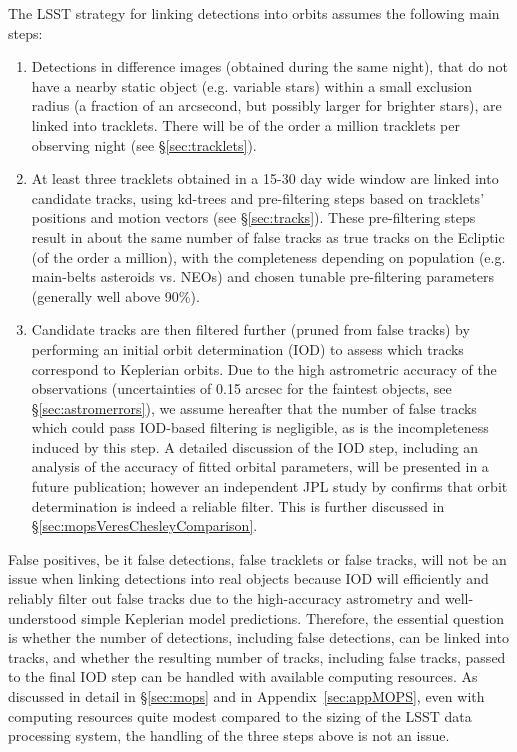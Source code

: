 The LSST strategy for linking detections into orbits assumes the following main steps:
\begin{enumerate}
\item Detections in difference images (obtained during the same night), that do not
         have a nearby static object (e.g. variable stars) within a small exclusion radius
         (a fraction of an arcsecond, but possibly larger for brighter stars), are linked into tracklets. There will be of the order
         a million tracklets per observing night (see \S\ref{sec:tracklets}).
\item At least three tracklets obtained in a 15-30 day wide window are linked into
         candidate tracks, using kd-trees and pre-filtering steps based on tracklets' positions
         and motion vectors (see \S\ref{sec:tracks}). These pre-filtering steps result in
         about the same number of false tracks as true tracks on the Ecliptic (of the order
         a million), with the completeness depending on population (e.g. main-belts
         asteroids vs. NEOs) and chosen tunable pre-filtering parameters (generally well above 90\%).
\item Candidate tracks are then filtered further (pruned from false tracks) by
        performing an initial orbit determination (IOD) to assess which tracks
        correspond to Keplerian orbits.
         Due to the high astrometric accuracy of the observations (uncertainties of 0.15 arcsec for the faintest objects,
         see \S\ref{sec:astromerrors}), we assume 
         hereafter that the number of false tracks which 
         could pass IOD-based filtering is negligible, as is the incompleteness induced by this 
         step. A detailed discussion of the IOD step, 
         including an analysis of the accuracy of fitted orbital parameters,  will be presented in 
         a future publication; however an independent JPL study by \citet{VeresChesley2017mops} 
          confirms that orbit determination is indeed a reliable filter. This is further discussed in \S\ref{sec:mopsVeresChesleyComparison}.
\end{enumerate}

False positives, be it false detections, false tracklets or false tracks, will not be
an issue when linking detections into real objects because IOD will efficiently and reliably filter 
out false tracks due to the high-accuracy
astrometry and well-understood simple Keplerian model predictions. Therefore, the
essential question is whether the number of detections, including false detections, can be 
linked into tracks, and whether the resulting number of tracks, including false tracks, 
passed to the final IOD step can be handled with available computing resources.
As discussed in detail in \S\ref{sec:mops} and in Appendix~\ref{sec:appMOPS}, 
even with computing resources quite modest compared to the
sizing of the LSST data processing system, the handling of the three steps above is not an issue.

